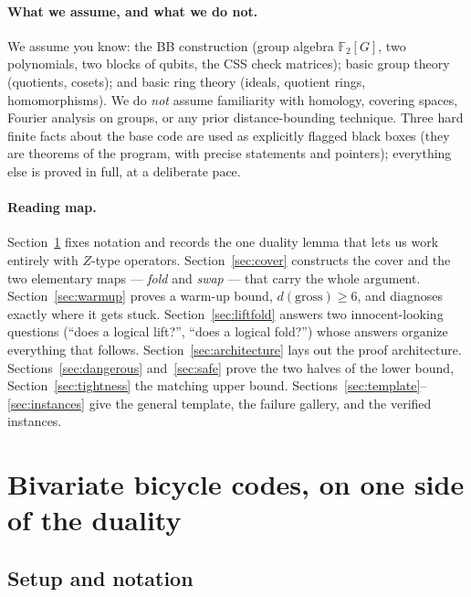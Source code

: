 \documentclass[11pt]{article}
\theoremstyle{plain}
\theoremstyle{definition}
\theoremstyle{remark}
\newcommand{\F}{\mathbb{F}}
\begin{document}
\paragraph{What we assume, and what we do not.}
We assume you know: the BB construction (group algebra $\F_2[G]$, two
polynomials, two blocks of qubits, the CSS check matrices); basic group theory
(quotients, cosets); and basic ring theory (ideals, quotient rings,
homomorphisms). We do \emph{not} assume familiarity with homology, covering
spaces, Fourier analysis on groups, or any prior distance-bounding technique.
Three hard finite facts about the base code are used as explicitly flagged black
boxes (they are theorems of the program, with precise statements and pointers);
everything else is proved in full, at a deliberate pace.

\paragraph{Reading map.}
Section~\ref{sec:setup} fixes notation and records the one duality lemma that
lets us work entirely with $Z$-type operators. Section~\ref{sec:cover}
constructs the cover and the two elementary maps --- \emph{fold} and
\emph{swap} --- that carry the whole argument. Section~\ref{sec:warmup} proves
a warm-up bound, $d(\mathrm{gross}) \geq 6$, and diagnoses exactly where it gets
stuck. Section~\ref{sec:liftfold} answers two innocent-looking questions
(``does a logical lift?'', ``does a logical fold?'') whose answers organize
everything that follows. Section~\ref{sec:architecture} lays out the proof
architecture. Sections~\ref{sec:dangerous} and~\ref{sec:safe} prove the two
halves of the lower bound, Section~\ref{sec:tightness} the matching upper
bound. Sections~\ref{sec:template}--\ref{sec:instances} give the general
template, the failure gallery, and the verified instances.

\section{Bivariate bicycle codes, on one side of the duality}
\label{sec:setup}

\subsection{Setup and notation}
\end{document}
